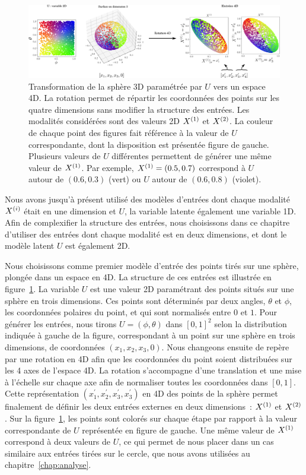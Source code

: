 \documentclass[../main]{subfiles}
\begin{document}
\begin{figure}
	\includegraphics[width=\textwidth]{sphere_inputs_colormap.png}
	\caption{Transformation de la sphère 3D paramétrée par $U$ vers un espace 4D. La rotation permet de répartir les coordonnées des points sur les quatre dimensions sans modifier la structure des entrées. Les modalités considérées sont des valeurs 2D $X^{({1})}$ et $X^{({2})}$.
	La couleur de chaque point des figures fait référence à la valeur de $U$ correspondante, dont la disposition est présentée figure de gauche. Plusieurs valeurs de $U$ différentes permettent de générer une même valeur de $X^{({1})}$. Par exemple, $X^{({1})} = (0.5, 0.7)$ correspond à $U$ autour de $(0.6,0.3)$ (vert) ou $U$ autour de $ (0.6,0.8)$ (violet).
	\label{fig:sphere_inputs}}
\end{figure}

Nous avons jusqu'à présent utilisé des modèles d'entrées dont chaque modalité $X^{({i})}$ était en une dimension et $U$, la variable latente également une variable 1D. 
Afin de complexifier la structure des entrées, nous choisissons dans ce chapitre d'utiliser des entrées dont chaque modalité est en deux dimensions, et dont le modèle latent $U$ est également 2D.

Nous choisissons comme premier modèle d'entrée des points tirés sur une sphère, plongée dans un espace en 4D. 
La structure de ces entrées est illustrée en figure~\ref{fig:sphere_inputs}.
La variable $U$ est une valeur 2D paramétrant des points situés sur une sphère en trois dimensions.
Ces points sont déterminés par deux angles, $\theta$ et $\phi$, les coordonnées polaires du point, et qui sont normalisés entre $0$ et $1$.
Pour générer les entrées, nous tirons $U = (\phi,\theta)$ dans $[0,1]^2$ selon la distribution indiquée à gauche de la figure, correspondant à un point sur une sphère en trois dimensions, de coordonnées $(x_1,x_2,x_3,0)$. Nous changeons ensuite de repère par une rotation en 4D afin que les coordonnées du point soient distribuées sur les 4 axes de l'espace 4D. La rotation s'accompagne d'une translation et une mise à l'échelle sur chaque axe afin de normaliser toutes les coordonnées dans $[0,1]$.
Cette représentation $(x_1^\prime,x_2^\prime,x_3^\prime,x_3^\prime)$ en 4D des points de la sphère permet finalement de définir les deux entrées externes en deux dimensions~: $X^{({1})}$ et $X^{({2})}$.
Sur la figure~\ref{fig:sphere_inputs}, les points sont colorés sur chaque étape par rapport à la valeur correspondante de $U$ représentée en figure de gauche.
Une même valeur de $X^{({1})}$ correspond à deux valeurs de $U$, ce qui permet de nous placer dans un cas similaire aux entrées tirées sur le cercle, que nous avons utilisées au chapitre~\ref{chap:analyse}.
\end{document}
